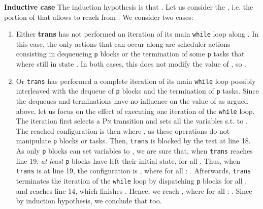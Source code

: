 \documentclass[runningheads,oribibl,]{article}
\newcommand{\pn}{\textsc{Pn}\xspace}
\newenvironment{proof}{\noindent{\it Proof.\hspace*{.5cm}}}{}
\newcommand{\qed}{\hfill}
\begin{document}
\begin{proof}
  \textbf{Inductive case } The induction hypothesis is
  that . Let us consider the
  , i.e. the portion of  that allows to reach
   from
  . We consider two cases:
  \begin{enumerate}
  \item Either \textbf{trans} has not performed an iteration of its
    main \texttt{while} loop along . In this case, the only
    actions that can occur along  are scheduler actions
    consisting in dequeueing \texttt{p} blocks or the termination of
    some \texttt{p} tasks that where still in state . In
    both cases, this does not modify the value of , so
    .
  \item Or \texttt{trans} has performed a complete iteration of its
    main \texttt{while} loop possibly interleaved with the dequeue
    of \texttt{p} blocks and the termination of \texttt{p}
    tasks. Since the dequeues and terminations have no influence on
    the value of  as argued above, let us focus on the effect
    of executing one iteration of the \texttt{while} loop. The
    iteration first selects a \pn transition  and sets all the
    variables  s.t.  to . The reached configuration
    is then  where , as these
    operations do not manipulate \texttt{p} blocks or tasks. Then,
    \texttt{trans} is blocked by the test at line 18. As only
    \texttt{p} blocks can set  variables to , we are sure
    that, when \texttt{trans} reaches line 19, \emph{at least}
     \texttt{p} blocks have left their initial state, for all
    . Thus, when \texttt{trans} is at line 19, the
    configuration is , where for all :
    . Afterwards,
    \texttt{trans} terminates the iteration of the \texttt{while} loop
    by dispatching  \texttt{p} blocks for all , and
    reaches line 14, which finishes . Hence, we reach
    , where for all :
    . Since
     by induction hypothesis, we
    conclude that  too.\qed
  \end{enumerate}

\end{proof}
\end{document}
